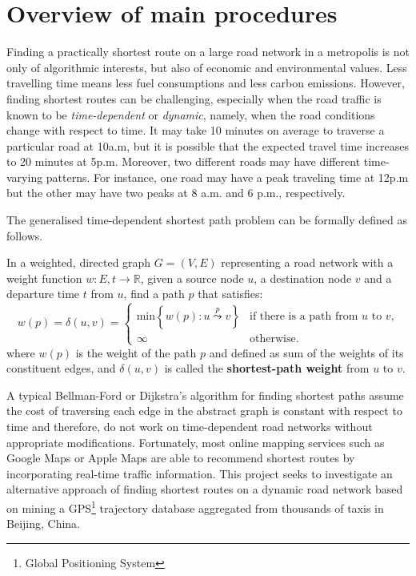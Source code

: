 \chapter{Overview of main procedures}

Finding a practically shortest route on a large road network in a metropolis is not only of algorithmic interests, but also of economic and environmental values. Less travelling time means less fuel consumptions and less carbon emissions. However, finding shortest routes can be challenging, especially when the road traffic is known to be \emph{time-dependent} or \emph{dynamic}, namely, when the road conditions change with respect to time. It may take 10 minutes on average to traverse a particular road at 10a.m, but it is possible that the expected travel time increases to 20 minutes at 5p.m. Moreover, two different roads may have different time-varying patterns. For instance, one road may have a peak traveling time at 12p.m but the other may have two peaks at 8 a.m. and 6 p.m., respectively.

The generalised time-dependent shortest path problem can be formally defined as follows.
\begin{defn}
In a weighted, directed graph $G=(V,E)$ representing a road network with a weight function $w : E,t \rightarrow \mathbb{R}$, given a source node $u$, a destination node $v$ and a departure time $t$ from $u$, find a path $p$ that satisfies:
\begin{equation}
w(p)=\delta(u,v)=
\begin{cases}
\text{min}\left\{w(p): u\overset{p}{\leadsto}v \right\} &\text{if there is a path from $u$ to $v$,}\\
\infty &\text{otherwise.}
\end{cases}
\end{equation}
where $w(p)$ is the weight of the path $p$ and defined as sum of the weights of its constituent edges, and $\delta(u,v)$ is called the \textbf{shortest-path weight} from $u$ to $v$.
\end{defn}

A typical Bellman-Ford\cite{CLRS09} or Dijkstra's algorithm\cite{Dij59} for finding shortest paths assume the cost of traversing each edge in the abstract graph is constant with respect to time and therefore, do not work on time-de\-pendent road networks without appropriate modifications. Fortunately, most online mapping services such as Google Maps or Apple Maps are able to recommend shortest routes by incorporating real-time traffic information. This project seeks to investigate an alternative approach of finding shortest routes on a dynamic road network based on mining a GPS\footnote{Global Positioning System} trajectory database aggregated from thousands of taxis in Beijing, China.

